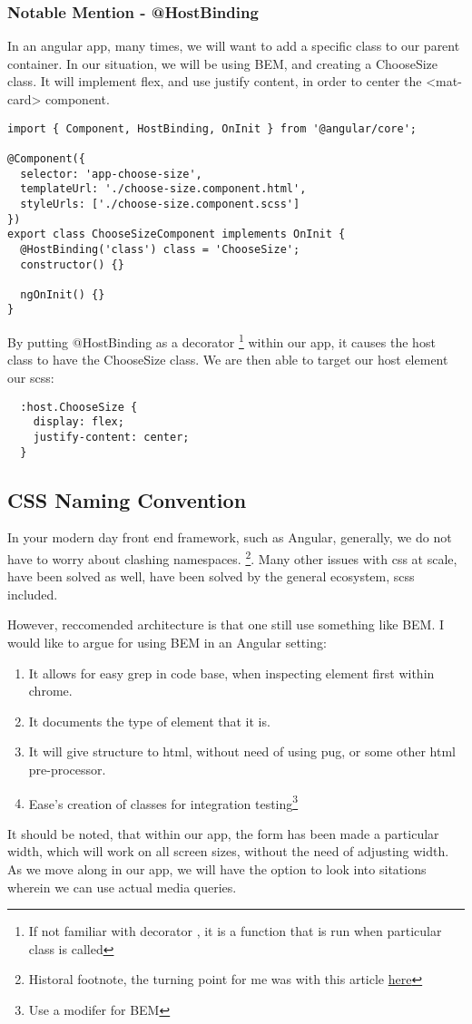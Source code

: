 \subsubsection{ Notable Mention - @HostBinding }
In an angular app, many times, we will want to add a specific class to our
parent container. In our situation, we will be using BEM, and creating a
ChooseSize class. It will implement flex, and use justify content, in order to
center the <mat-card> component.

\begin{lstlisting}[caption=My Javascript Example]
import { Component, HostBinding, OnInit } from '@angular/core';

@Component({
  selector: 'app-choose-size',
  templateUrl: './choose-size.component.html',
  styleUrls: ['./choose-size.component.scss']
})
export class ChooseSizeComponent implements OnInit {
  @HostBinding('class') class = 'ChooseSize';
  constructor() {}

  ngOnInit() {}
}
\end{lstlisting}

By putting @HostBinding as a decorator \footnote{If not familiar with decorator
, it is a function that is run when particular class is called} within our app,
it causes the host class to have the ChooseSize class. We are then able to
target our host element our scss:
\begin{verbatim}
  :host.ChooseSize {
    display: flex;
    justify-content: center;
  }
\end{verbatim}

\subsection{ CSS Naming Convention }
In your modern day front end framework, such as Angular, generally, we do not
have to worry about clashing namespaces. \footnote{Historal footnote, the
turning point for me was with this article \href{https://glenmaddern.com/articles/css-modules}{here}}.
Many other issues with css at scale, have been solved as well, have been 
solved by the general ecosystem, scss included.

However, reccomended architecture is that one still use something like BEM. I
would like to argue for using BEM in an Angular setting:
\begin{enumerate}
  \item It allows for easy grep in code base, when inspecting element first
  within chrome.
  \item It documents the type of element that it is.
  \item It will give structure to html, without need of using pug, or some other
  html pre-processor.
  \item Ease's creation of classes for integration testing\footnote{Use a modifer
  for BEM}
\end{enumerate}

It should be noted, that within our app, the form has been made a particular
width, which will work on all screen sizes, without the need of adjusting width.
As we move along in our app, we will have the option to look into sitations
wherein we can use actual media queries.
